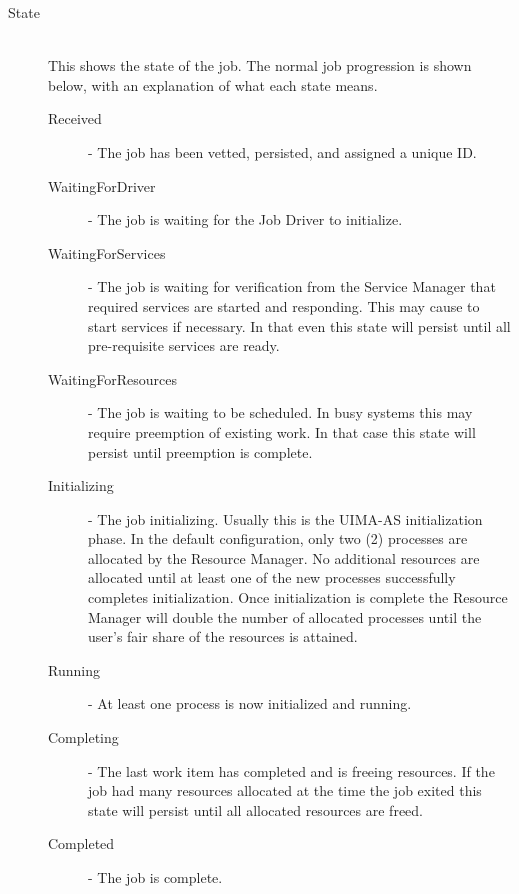 \begin{description}
            \item[State] \hfill \\
              This shows the state of the job.  The normal job progression is shown below, with an
              explanation of what each state means.
              \begin{description}
                  \item[Received] - The job has been vetted, persisted, and assigned a unique ID. 
                  \item[WaitingForDriver] - The job is waiting for the Job Driver to initialize. 
                  \item[WaitingForServices] - The job is waiting for verification from the
                    Service Manager that required services are started and responding.  This may
                    cause {\DUCC} to start services if necessary.  In that even this state will
                    persist until all pre-requisite services are ready.
                  \item[WaitingForResources] - The job is waiting to be scheduled. In busy
                    systems this may require preemption of existing work.  In that case this
                    state will persist until preemption is complete.
                  \item[Initializing] - The job initializing. Usually this
                    is the UIMA-AS initialization phase.  In the default configuration, only
                    two (2) processes are allocated by the Resource Manager.  No additional
                    resources are allocated until at least one of the new processes successfully
                    completes initialization.  Once initialization is complete the Resource Manager
                    will double the number of allocated processes until the user's fair share of
                    the resources is attained.
                  \item[Running] - At least one process is now initialized and running. 
                  \item[Completing] - The last work item has completed and {\DUCC} is freeing resources.
                    If the job had many resources allocated at the time the job exited this state
                    will persist until all allocated resources are freed.
                  \item[Completed] - The job is complete. 
              \end{description}
                  

\end{description}
